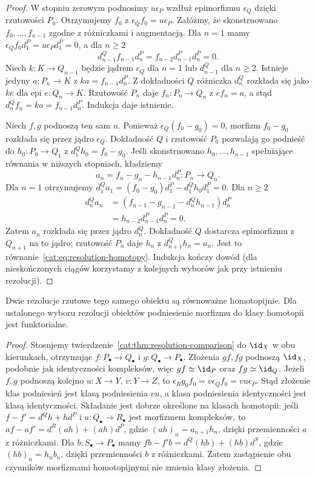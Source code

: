 \begin{proof}
W stopniu zerowym podnosimy $u\epsilon_P$ wzdłuż epimorfizmu $\epsilon_Q$ dzięki rzutowości $P_0$. Otrzymujemy $f_0$ z $\epsilon_Q f_0=u\epsilon_P$. Załóżmy, że skonstruowano $f_0,\ldots,f_{n-1}$ zgodne z różniczkami i augmentacją. Dla $n=1$ mamy $\epsilon_Q f_0d_1^P=u\epsilon_Pd_1^P=0$, a dla $n\ge2$
\[
 d_{n-1}^Q f_{n-1}d_n^P=f_{n-2}d_{n-1}^Pd_n^P=0.
\]
Niech $k:K\to Q_{n-1}$ będzie jądrem $\epsilon_Q$ dla $n=1$ lub $d_{n-1}^Q$ dla $n\ge2$. Istnieje jedyny $a:P_n\to K$ z $ka=f_{n-1}d_n^P$. Z dokładności $Q$ różniczka $d_n^Q$ rozkłada się jako $ke$ dla epi $e:Q_n\to K$. Rzutowość $P_n$ daje $f_n:P_n\to Q_n$ z $ef_n=a$, a stąd $d_n^Qf_n=ka=f_{n-1}d_n^P$. Indukcja daje istnienie.

Niech $f,g$ podnoszą ten sam $u$. Ponieważ $\epsilon_Q(f_0-g_0)=0$, morfizm $f_0-g_0$ rozkłada się przez jądro $\epsilon_Q$. Dokładność $Q$ i rzutowość $P_0$ pozwalają go podnieść do $h_0:P_0\to Q_1$ z $d_1^Qh_0=f_0-g_0$.
Jeśli skonstruowano $h_0,\ldots,h_{n-1}$ spełniające równania w niższych stopniach, kładziemy
\[
 a_n=f_n-g_n-h_{n-1}d_n^P:P_n\to Q_n.
\]
Dla $n=1$ otrzymujemy
$d_1^Qa_1=(f_0-g_0)d_1^P-d_1^Qh_0d_1^P=0$.
Dla $n\ge2$
\[
\begin{aligned}
 d_n^Qa_n
 &=(f_{n-1}-g_{n-1}-d_n^Qh_{n-1})d_n^P\\
 &=h_{n-2}d_{n-1}^Pd_n^P=0.
\end{aligned}
\]
Zatem $a_n$ rozkłada się przez jądro $d_n^Q$. Dokładność $Q$ dostarcza epimorfizmu z $Q_{n+1}$ na to jądro; rzutowość $P_n$ daje $h_n$ z $d_{n+1}^Qh_n=a_n$. Jest to równanie~\eqref{cat:eq:resolution-homotopy}. Indukcja kończy dowód (dla nieskończonych ciągów korzystamy z kolejnych wyborów jak przy istnieniu rezolucji).
\end{proof}
\begin{wniosek}\label{cat:cor:resolution-homotopy-equivalence}
Dwie rezolucje rzutowe tego samego obiektu są równoważne homotopijnie. Dla ustalonego wyboru rezolucji obiektów podniesienie morfizmu do klasy homotopii jest funktorialne.
\end{wniosek}
\begin{proof}
Stosujemy twierdzenie~\ref{cat:thm:resolution-comparison} do $\id_X$ w obu kierunkach, otrzymując $f:P_\bullet\to Q_\bullet$ i $g:Q_\bullet\to P_\bullet$. Złożenia $gf,fg$ podnoszą $\id_X$, podobnie jak identyczności kompleksów, więc $gf\simeq\id_P$ oraz $fg\simeq\id_Q$. Jeżeli $f,g$ podnoszą kolejno $u:X\to Y$, $v:Y\to Z$, to $\epsilon_Rg_0f_0=v\epsilon_Qf_0=vu\epsilon_P$. Stąd złożenie klas podniesień jest klasą podniesienia $vu$, a klasa podniesienia identyczności jest klasą identyczności.
Składanie jest dobrze określone na klasach homotopii: jeśli $f-f'=d^Qh+hd^P$ i $a:Q_\bullet\to R_\bullet$ jest morfizmem kompleksów, to
$af-af'=d^R(ah)+(ah)d^P$, gdzie $(ah)_n=a_{n+1}h_n$, dzięki przemienności $a$ z różniczkami.
Dla $b:S_\bullet\to P_\bullet$ mamy
$fb-f'b=d^Q(hb)+(hb)d^S$, gdzie $(hb)_n=h_nb_n$, dzięki przemienności $b$ z różniczkami.
Zatem zastąpienie obu czynników morfizmami homotopijnymi nie zmienia klasy złożenia.
\end{proof}
